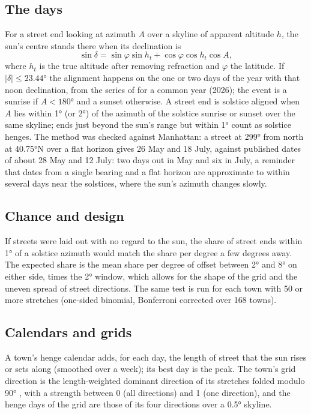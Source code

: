 \documentclass[11pt,a4paper]{article}
\begin{document}
\subsection{The days}
For a street end looking at azimuth $A$ over a skyline of apparent altitude $h$, the sun's centre stands there when its declination is
\[\sin\delta = \sin\varphi\sin h_t + \cos\varphi\cos h_t\cos A,\]
where $h_t$ is the true altitude after removing refraction \citep{bennett} and $\varphi$ the latitude. If $|\delta| \le 23.44°$ the alignment happens on the one or two days of the year with that noon declination, from the series of \citet{spencer} for a common year (2026); the event is a sunrise if $A < 180°$ and a sunset otherwise. A street end is solstice aligned when $A$ lies within 1° (or 2°) of the azimuth of the solstice sunrise or sunset over the same skyline; ends just beyond the sun's range but within 1° count as solstice henges. The method was checked against Manhattan: a street at 299° from north at 40.75°N over a flat horizon gives 26 May and 18 July, against published dates of about 28 May and 12 July: two days out in May and six in July, a reminder that dates from a single bearing and a flat horizon are approximate to within several days near the solstices, where the sun's azimuth changes slowly.

\subsection{Chance and design}
If streets were laid out with no regard to the sun, the share of street ends within 1° of a solstice azimuth would match the share per degree a few degrees away. The expected share is the mean share per degree of offset between 2° and 8° on either side, times the 2° window, which allows for the shape of the grid and the uneven spread of street directions. The same test is run for each town with 50 or more stretches (one-sided binomial, Bonferroni corrected over 168 towns).

\subsection{Calendars and grids}
A town's henge calendar adds, for each day, the length of street that the sun rises or sets along (smoothed over a week); its best day is the peak. The town's grid direction is the length-weighted dominant direction of its stretches folded modulo 90° \citep[compare][]{boeing}, with a strength between 0 (all directions) and 1 (one direction), and the henge days of the grid are those of its four directions over a 0.5° skyline.
\end{document}
